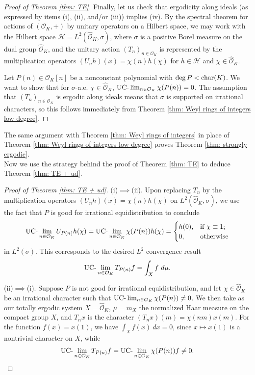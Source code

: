 \documentclass{amsart}
\theoremstyle{definition}
\numberwithin{equation}{section}
\newcommand{\mO}{\mathcal{O}}
\renewcommand{\hat}{\widehat}
\newcommand{\UClim}{\textup{UC-}\lim}
\newcommand{\Hil}{\mathcal{H}}
\renewcommand{\char}{\textup{char}}
\begin{document}
\begin{proof}[Proof of Theorem \ref{thm: TE}]
    Finally, let us check that ergodicity along ideals (as expressed by items (i), (ii), and/or (iii)) implies (iv).
	By the spectral theorem for actions of $(\mO_K,+)$ by unitary operators on a Hilbert space, we may work with the Hilbert space $\Hil = L^2 \left( \hat{\mO}_K, \sigma \right)$, where $\sigma$ is a positive Borel measure on the dual group $\hat{\mO}_K$, and the unitary action $(T_n)_{n \in \mO_K}$ is represented by the multiplication operators $(U_nh)(x) = \chi(n) h(\chi)$ for $h \in \Hil$ and $\chi \in \hat{\mO}_K$.

    Let $P(n) \in \mO_K[n]$ be a nonconstant polynomial with $\deg{P} < \char(K)$.
    We want to show that for $\sigma$-a.e. $\chi \in \hat{\mO}_K$, $\UClim_{n \in \mO_K} \chi(P(n)) = 0$.
The assumption that $(T_n)_{n \in \mO_K}$ is ergodic along ideals means that $\sigma$ is supported on irrational characters, so this follows immediately from Theorem \ref{thm: Weyl rings of integers low degree}.
\end{proof}

The same argument with Theorem \ref{thm: Weyl rings of integers} in place of Theorem \ref{thm: Weyl rings of integers low degree} proves Theorem \ref{thm: strongly ergodic}. \\

Now we use the strategy behind the proof of Theorem \ref{thm: TE} to deduce Theorem \ref{thm: TE + ud}.

\begin{proof}[Proof of Theorem \ref{thm: TE + ud}]
    (i)$\implies$(ii).
    Upon replacing $T_n$ by the multiplication operators $(U_nh)(x) = \chi(n) h(\chi)$ on $L^2 \left( \hat{\mO}_K, \sigma \right)$, we use the fact that $P$ is good for irrational equidistribution to conclude
    \begin{equation*}
    	\UClim_{n \in \mO_K} U_{P(n)} h(\chi)
	   = \UClim_{n \in \mO_K} \chi(P(n)) h(\chi)
	   = \begin{cases}
	 	 h(0), & \text{if}~\chi \equiv 1; \\
		  0, & \text{otherwise}
	   \end{cases}
    \end{equation*}
    in $L^2(\sigma)$.
    This corresponds to the desired $L^2$ convergence result
    \begin{equation*}
	   \UClim_{n \in \mO_K} T_{P(n)}f = \int_X f~d\mu.
    \end{equation*}
    
    (ii)$\implies$(i).
    Suppose $P$ is not good for irrational equidistribution, and let $\chi \in \hat{\mO}_K$ be an irrational character such that $\UClim_{n \in \mO_K} \chi(P(n)) \ne 0$.
    We then take as our totally ergodic system $X = \hat{\mO}_K$, $\mu = m_X$ the normalized Haar measure on the compact group $X$, and $T_nx$ is the character $(T_nx)(m) = \chi(nm) x(m)$.
    For the function $f(x) = x(1)$, we have $\int_X f(x)~dx = 0$, since $x \mapsto x(1)$ is a nontrivial character on $X$, while
    \begin{equation*}
	   \UClim_{n \in \mO_K} T_{P(n)} f
	   = \UClim_{n \in \mO_K} \chi(P(n))f \ne 0.
    \end{equation*}
\end{proof}
\end{document}
